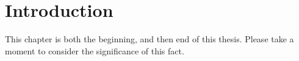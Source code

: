 \chapter{Introduction}
This chapter is both the beginning, and then end of this thesis. Please take a moment to consider the significance of this fact.

